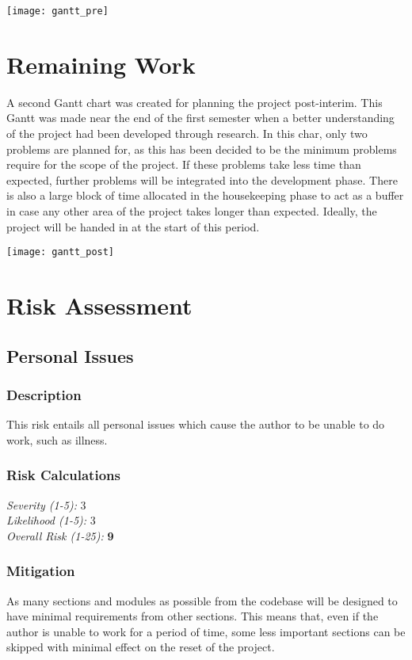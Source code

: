 \texttt{[image: gantt\_pre]}



\section{Remaining Work}
A second Gantt chart was created for planning the project post-interim. This Gantt was made near the end of the first semester when a better understanding of the project had been developed through research. In this char, only two problems are planned for, as this has been decided to be the minimum problems require for the scope of the project. If these problems take less time than expected, further problems will be integrated into the development phase. There is also a large block of time allocated in the housekeeping phase to act as a buffer in case any other area of the project takes longer than expected. Ideally, the project will be handed in at the start of this period.

\texttt{[image: gantt\_post]}



\section{Risk Assessment}
\subsection{Personal Issues}

\subsubsection{Description}
This risk entails all personal issues which cause the author to be unable to do work, such as illness.

\subsubsection{Risk Calculations}
\emph{Severity (1-5):} 3 \\
\emph{Likelihood (1-5):} 3 \\
\emph{Overall Risk (1-25):} \textbf{9}

\subsubsection{Mitigation}
As many sections and modules as possible from the codebase will be designed to have minimal requirements from other sections. This means that, even if the author is unable to work for a period of time, some less important sections can be skipped with minimal effect on the reset of the project.

